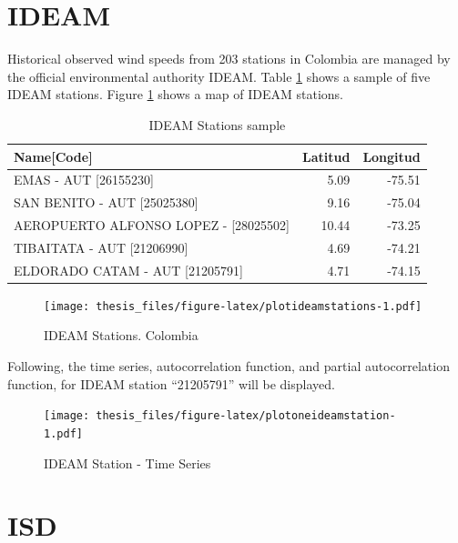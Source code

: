 \documentclass[12pt,oneside]{reedthesis}
\begin{document}
\hypertarget{ideam}{%
\section{IDEAM}\label{ideam}}

Historical observed wind speeds from 203 stations in Colombia are managed by the official environmental authority IDEAM. Table \ref{tab:tableideamstations} shows a sample of five IDEAM stations. Figure \ref{fig:plotideamstations} shows a map of IDEAM stations.
\begin{longtable}[t]{lrr}
\caption[IDEAM Stations]{\label{tab:tableideamstations}IDEAM Stations sample}\\
\toprule
Name[Code] & Latitud & Longitud\\
\midrule
EMAS - AUT [26155230] & 5.09 & -75.51\\
SAN BENITO - AUT [25025380] & 9.16 & -75.04\\
AEROPUERTO ALFONSO LOPEZ - [28025502] & 10.44 & -73.25\\
TIBAITATA - AUT [21206990] & 4.69 & -74.21\\
ELDORADO CATAM - AUT [21205791] & 4.71 & -74.15\\
\bottomrule
\end{longtable}
\begin{figure}
\centering
\texttt{[image: thesis\_files/figure-latex/plotideamstations-1.pdf]}
\caption{\label{fig:plotideamstations}IDEAM Stations. Colombia}
\end{figure}
Following, the time series, autocorrelation function, and partial autocorrelation function, for IDEAM station ``21205791'' will be displayed.
\begin{figure}
\centering
\texttt{[image: thesis\_files/figure-latex/plotoneideamstation-1.pdf]}
\caption{\label{fig:plotoneideamstation}IDEAM Station - Time Series}
\end{figure}
\hypertarget{isd}{%
\section{ISD}\label{isd}}
\end{document}
